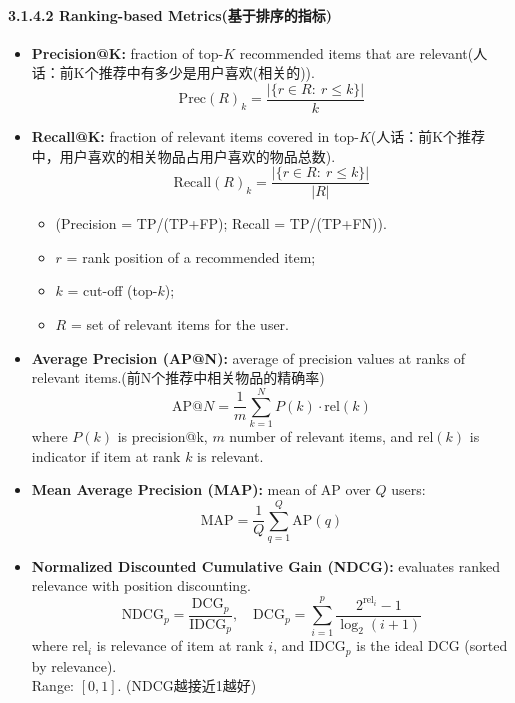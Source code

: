 \documentclass[UTF8]{ctexart}
\begin{document}
    \paragraph{3.1.4.2 Ranking-based Metrics(基于排序的指标)}
    \begin{itemize}
        \item \textbf{Precision@K:} fraction of top-$K$ recommended items that are relevant(人话：前K个推荐中有多少是用户喜欢(相关的)).
        \[\text{Prec}(R)_k = \frac{|\{r \in R:\ r \le k\}|}{k}\]

        \item \textbf{Recall@K:} fraction of relevant items covered in top-$K$(人话：前K个推荐中，用户喜欢的相关物品占用户喜欢的物品总数).
        \[\text{Recall}(R)_k = \frac{|\{r \in R:\ r \le k\}|}{|R|}\]
        \begin{itemize}
            \item (Precision = TP/(TP+FP); Recall = TP/(TP+FN)).
            \item $r$ = rank position of a recommended item; 
            \item $k$ = cut-off (top-$k$); 
            \item $R$ = set of relevant items for the user.
        
        \end{itemize}
        \item \textbf{Average Precision (AP@N):} average of precision values at ranks of relevant items.(前N个推荐中相关物品的精确率)
        \[\text{AP@}N = \frac{1}{m} \sum_{k=1}^{N} P(k) \cdot \text{rel}(k)\]
        where $P(k)$ is precision@k, $m$ number of relevant items, and $\text{rel}(k)$ is indicator if item at rank $k$ is relevant.

        \item \textbf{Mean Average Precision (MAP):} mean of AP over $Q$ users: 
        \[\text{MAP} = \frac{1}{Q} \sum_{q=1}^{Q} \text{AP}(q)\]

        \item \textbf{Normalized Discounted Cumulative Gain (NDCG):} evaluates ranked relevance with position discounting.
        \[\text{NDCG}_p = \frac{\text{DCG}_p}{\text{IDCG}_p},\quad \text{DCG}_p = \sum_{i=1}^{p} \frac{2^{\text{rel}_i}-1}{\log_2(i+1)}\]
        where $\text{rel}_i$ is relevance of item at rank $i$, and $\text{IDCG}_p$ is the ideal DCG (sorted by relevance). \\
        Range: $[0,1]$. (NDCG越接近1越好)


\end{itemize}
\end{document}
